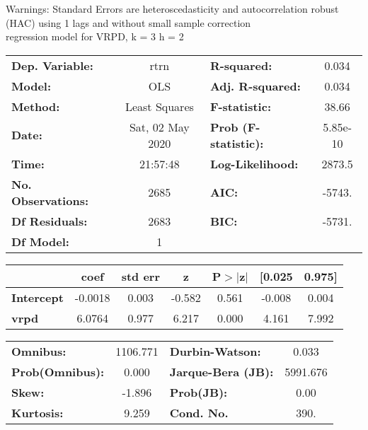 Warnings: \newline
 [1] Standard Errors are heteroscedasticity and autocorrelation robust (HAC) using 1 lags and without small sample correction\\ 

regression model for VRPD, k = 3 h = 2\begin{center}
\begin{tabular}{lclc}
\toprule
\textbf{Dep. Variable:}    &       rtrn       & \textbf{  R-squared:         } &     0.034   \\
\textbf{Model:}            &       OLS        & \textbf{  Adj. R-squared:    } &     0.034   \\
\textbf{Method:}           &  Least Squares   & \textbf{  F-statistic:       } &     38.66   \\
\textbf{Date:}             & Sat, 02 May 2020 & \textbf{  Prob (F-statistic):} &  5.85e-10   \\
\textbf{Time:}             &     21:57:48     & \textbf{  Log-Likelihood:    } &    2873.5   \\
\textbf{No. Observations:} &        2685      & \textbf{  AIC:               } &    -5743.   \\
\textbf{Df Residuals:}     &        2683      & \textbf{  BIC:               } &    -5731.   \\
\textbf{Df Model:}         &           1      & \textbf{                     } &             \\
\bottomrule
\end{tabular}
\begin{tabular}{lcccccc}
                   & \textbf{coef} & \textbf{std err} & \textbf{z} & \textbf{P$> |$z$|$} & \textbf{[0.025} & \textbf{0.975]}  \\
\midrule
\textbf{Intercept} &      -0.0018  &        0.003     &    -0.582  &         0.561        &       -0.008    &        0.004     \\
\textbf{vrpd}      &       6.0764  &        0.977     &     6.217  &         0.000        &        4.161    &        7.992     \\
\bottomrule
\end{tabular}
\begin{tabular}{lclc}
\textbf{Omnibus:}       & 1106.771 & \textbf{  Durbin-Watson:     } &    0.033  \\
\textbf{Prob(Omnibus):} &   0.000  & \textbf{  Jarque-Bera (JB):  } & 5991.676  \\
\textbf{Skew:}          &  -1.896  & \textbf{  Prob(JB):          } &     0.00  \\
\textbf{Kurtosis:}      &   9.259  & \textbf{  Cond. No.          } &     390.  \\
\bottomrule
\end{tabular}
\end{center}


